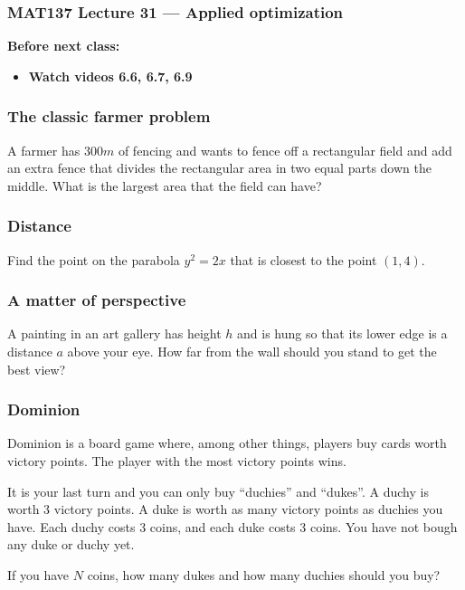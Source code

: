 \documentclass[14pt]{beamer}
\begin{document}
\begin{frame}
	\frametitle{MAT137 Lecture 31 --- Applied optimization}

	\vfill
	{\bf Before next class:}
		\begin{itemize} \normalsize
			\item {\bf Watch videos 6.6, 6.7, 6.9}
		\end{itemize}
\end{frame}

	\begin{frame}[t]
		\frametitle{The classic farmer problem}

		A farmer has $300m$ of fencing and wants to fence off a rectangular field
		and add an extra fence that divides the rectangular area in two equal parts
		down the middle. What is the largest area that the field can have?
	\end{frame}

	\begin{frame}[t]
		\frametitle{Distance}

		Find the point on the parabola $y^{2}=2x$ that is closest to the point
		$(1,4)$.
	\end{frame}
	\begin{frame}[t]
		\frametitle{A matter of perspective}

		A painting in an art gallery has height $h$ and is hung so that its lower
		edge is a distance $a$ above your eye. How far from the wall should you stand
		to get the best view?
	\end{frame}

	\begin{frame}[t]
		\frametitle{Dominion}

		Dominion is a board game where, among other things, players buy cards worth
		victory points. The player with the most victory points wins.

		\medskip It is your last turn and you can only buy ``duchies'' and ``dukes''.
		A duchy is worth 3 victory points. A duke is worth as many victory points as
		duchies you have. Each duchy costs 3 coins, and each duke costs 3 coins. You
		have not bough any duke or duchy yet.

		\medskip If you have $N$ coins, how many dukes and how many duchies should you
		buy?
	\end{frame}
\end{document}
